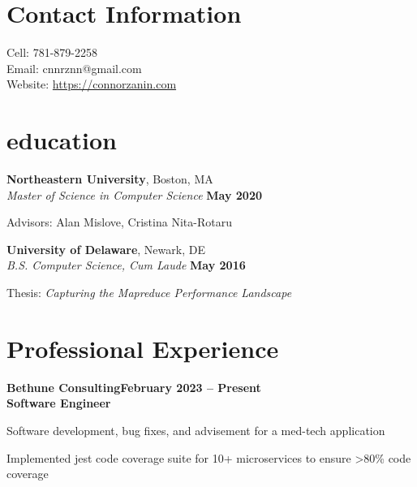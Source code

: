 \documentclass[10pt,margin,line]{resume}
\begin{document}
\begin{resume}
\begin{small}


\section{\mysidestyle Contact Information}
\mbox{} \hfill Cell: 781-879-2258\\
\mbox{} \hfill Email: cnnrznn@gmail.com\\
\mbox{} \hfill Website: \url{https://connorzanin.com}\\   


\section{\mysidestyle education}
\textbf{Northeastern University}, Boston, MA \vspace{1mm}\\%
\textsl{Master of Science in Computer Science} \hfill \textbf{May 2020}
\vspace{-3mm}\\\vspace{-1mm}%
\begin{list2}
	\item Advisors: Alan Mislove, Cristina Nita-Rotaru
\end{list2}

\textbf{University of Delaware}, Newark, DE \vspace{1mm}\\%
\textsl{B.S. Computer Science, Cum Laude} \hfill \textbf{May 2016}\vspace{-3mm}\\\vspace{-1mm}%
\begin{list2}
    \item Thesis: \textsl{Capturing the Mapreduce Performance Landscape}
\end{list2}\vspace{-1.5mm}




\section{\mysidestyle Professional Experience}

\textbf{Bethune Consulting}\hfill\textbf{February 2023 -- Present}\\
\textbf{Software Engineer}\hfill
\vspace{-3mm}\\\vspace{-1mm}
\begin{list2}
    \item Software development, bug fixes, and advisement for a med-tech application
    \item Implemented jest code coverage suite for 10+ microservices to ensure >80\% code coverage
\end{list2}


\end{small}
\end{resume}
\end{document}
